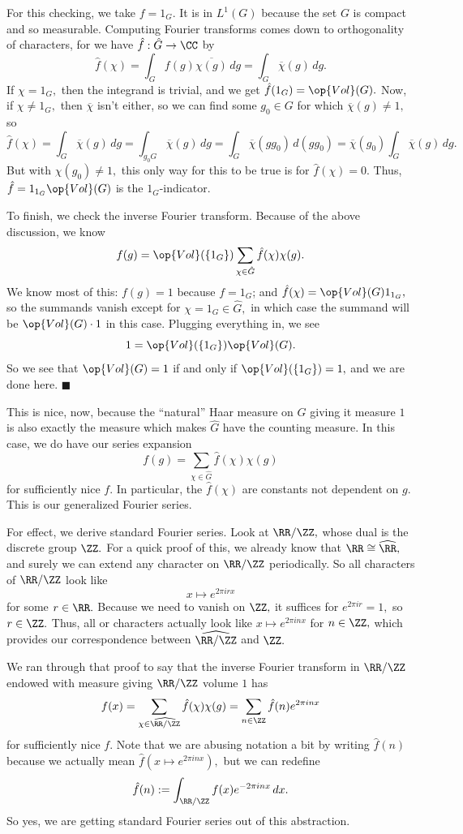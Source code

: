 For this checking, we take $f=1_G.$ It is in $L^1(G)$ because the set $G$ is compact and so measurable. Computing Fourier transforms comes down to orthogonality of characters, for we have $\hat f:\hat G\to\CC$ by
\[\hat f(\chi)=\int_Gf(g)\overline{\chi(g)}\,dg=\int_G\overline\chi(g)\,dg.\]
If $\chi=1_G,$ then the integrand is trivial, and we get $\hat f(1_G)=\op{Vol}(G).$ Now, if $\chi\ne1_G,$ then $\overline\chi$ isn't either, so we can find some $g_0\in G$ for which $\overline\chi(g)\ne1,$ so
\[\hat f(\chi)=\int_G\overline\chi(g)\,dg=\int_{g_0G}\overline\chi(g)\,dg=\int_G\overline\chi(gg_0)\,d(gg_0)=\overline\chi(g_0)\int_G\overline\chi(g)\,dg.\]
But with $\chi(g_0)\ne1,$ this only way for this to be true is for $\hat f(\chi)=0.$ Thus, $\hat f=1_{1_G}\op{Vol}(G)$ is the $1_G$-indicator.

To finish, we check the inverse Fourier transform. Because of the above discussion, we know
\[f(g)=\op{Vol}(\{1_G\})\sum_{\chi\in\hat G}\hat f(\chi)\chi(g).\]
We know most of this: $f(g)=1$ because $f=1_G$; and $\hat f(\chi)=\op{Vol}(G)1_{1_G},$ so the summands vanish except for $\chi=1_G\in\hat G,$ in which case the summand will be $\op{Vol}(G)\cdot1$ in this case. Plugging everything in, we see
\[1=\op{Vol}(\{1_G\})\op{Vol}(G).\]
So we see that $\op{Vol}(G)=1$ if and only if $\op{Vol}(\{1_G\})=1,$ and we are done here. $\blacksquare$

This is nice, now, because the ``natural'' Haar measure on $G$ giving it measure $1$ is also exactly the measure which makes $\hat G$ have the counting measure. In this case, we do have our series expansion
\[f(g)=\sum_{\chi\in\hat G}\hat f(\chi)\chi(g)\]
for sufficiently nice $f.$ In particular, the $\hat f(\chi)$ are constants not dependent on $g.$ This is our generalized Fourier series.

For effect, we derive standard Fourier series. Look at $\RR/\ZZ,$ whose dual is the discrete group $\ZZ.$ For a quick proof of this, we already know that $\RR\cong\widehat\RR,$ and surely we can extend any character on $\RR/\ZZ$ periodically. So all characters of $\RR/\ZZ$ look like
\[x\mapsto e^{2\pi irx}\]
for some $r\in\RR.$ Because we need to vanish on $\ZZ,$ it suffices for $e^{2\pi ir}=1,$ so $r\in\ZZ.$ Thus, all or characters actually look like $x\mapsto e^{2\pi inx}$ for $n\in\ZZ,$ which provides our correspondence between $\widehat{\RR/\ZZ}$ and $\ZZ.$

We ran through that proof to say that the inverse Fourier transform in $\RR/\ZZ$ endowed with measure giving $\RR/\ZZ$ volume $1$ has
\[f(x)=\sum_{\chi\in\widehat{\RR/\ZZ}}\hat f(\chi)\chi(g)=\sum_{n\in\ZZ}\hat f(n)e^{2\pi inx}\]
for sufficiently nice $f.$ Note that we are abusing notation a bit by writing $\hat f(n)$ because we actually mean $\hat f(x\mapsto e^{2\pi inx}),$ but we can redefine
\[\hat f(n):=\int_{\RR/\ZZ}f(x)e^{-2\pi inx}\,dx.\]
So yes, we are getting standard Fourier series out of this abstraction.

